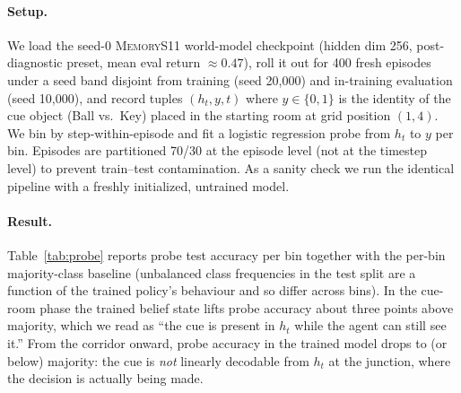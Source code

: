 \documentclass[letterpaper]{article}
\begin{document}
\paragraph{Setup.}
We load the seed-0 \textsc{MemoryS11} world-model checkpoint
(hidden dim 256, post-diagnostic preset, mean eval return $\approx 0.47$),
roll it out for 400 fresh episodes under a seed band disjoint from
training (seed 20{,}000) and in-training evaluation (seed 10{,}000), and
record tuples $(h_t, y, t)$ where $y \in \{0,1\}$ is the identity of the
cue object (Ball vs.\ Key) placed in the starting room at grid position
$(1,4)$. We bin by step-within-episode and fit a logistic regression
probe from $h_t$ to $y$ per bin. Episodes are partitioned 70/30 at the
episode level (not at the timestep level) to prevent train--test
contamination. As a sanity check we run the identical pipeline with a
freshly initialized, untrained model.

\paragraph{Result.}
Table~\ref{tab:probe} reports probe test accuracy per bin together with
the per-bin majority-class baseline (unbalanced class frequencies in the
test split are a function of the trained policy's behaviour and so
differ across bins). In the cue-room phase the trained belief state lifts
probe accuracy about three points above majority, which we read as
``the cue is present in $h_t$ while the agent can still see it.'' From
the corridor onward, probe accuracy in the trained model drops to (or
below) majority: the cue is \emph{not} linearly decodable from $h_t$ at
the junction, where the decision is actually being made.
\end{document}
